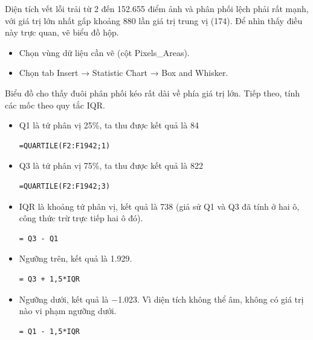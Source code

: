 \documentclass[12pt]{article}
\begin{document}
\noindent
Diện tích vết lỗi trải từ 2 đến 152.655 điểm ảnh và phân phối lệch phải rất mạnh, với giá trị lớn nhất gấp khoảng 880 lần giá trị trung vị (174). Để nhìn thấy điều này trực quan, vẽ biểu đồ hộp.
\begin{itemize}
    \item Chọn vùng dữ liệu cần vẽ (cột Pixels\_Areas).
    \item Chọn tab Insert → Statistic Chart → Box and Whisker.
\end{itemize}
Biểu đồ cho thấy đuôi phân phối kéo rất dài về phía giá trị lớn. Tiếp theo, tính các mốc theo quy tắc IQR.
\begin{itemize}
    \item Q1 là tứ phân vị 25\%, ta thu được kết quả là 84
    \begin{aivncodebox}[Q1]
    \begin{lstlisting}[language=Excel]
=QUARTILE(F2:F1942;1)\end{lstlisting}
    \end{aivncodebox}

    \item Q3 là tứ phân vị 75\%, ta thu được kết quả là 822
    \begin{aivncodebox}[Q3]
    \begin{lstlisting}[language=Excel]
=QUARTILE(F2:F1942;3)\end{lstlisting}
    \end{aivncodebox}

    \item IQR là khoảng tứ phân vị, kết quả là 738 (giả sử Q1 và Q3 đã tính ở hai ô, công thức trừ trực tiếp hai ô đó).
    \begin{aivncodebox}[IQR]
    \begin{lstlisting}[language=Excel]
= Q3 - Q1\end{lstlisting}
    \end{aivncodebox}

    \item Ngưỡng trên, kết quả là 1.929.
    \begin{aivncodebox}
    \begin{lstlisting}[language=Excel]
= Q3 + 1,5*IQR\end{lstlisting}
    \end{aivncodebox}

    \item Ngưỡng dưới, kết quả là $-$1.023. Vì diện tích không thể âm, không có giá trị nào vi phạm ngưỡng dưới.
    \begin{aivncodebox}
    \begin{lstlisting}[language=Excel]
= Q1 - 1,5*IQR\end{lstlisting}
    \end{aivncodebox}


\end{itemize}
\end{document}
